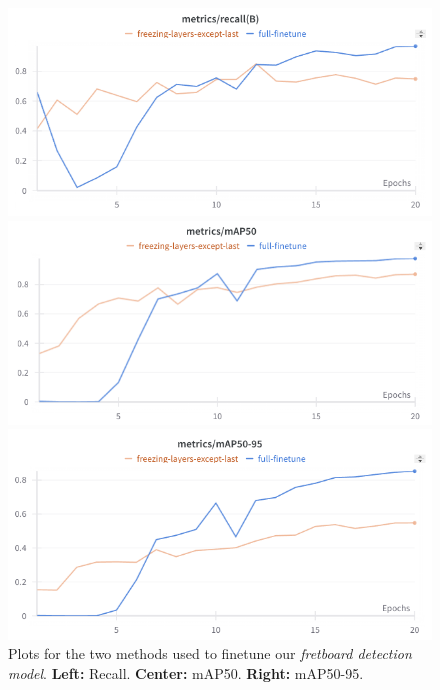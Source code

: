 \documentclass[10pt,twocolumn,letterpaper]{article}
\begin{document}
\begin{figure}[h]
    \begin{minipage}{0.33\textwidth}
        \centering
        \includegraphics[width=\textwidth]{images/interim/metrics-recall-fretboard.png}
    \end{minipage}
    \hfill
    \begin{minipage}{0.33\textwidth}
        \centering
        \includegraphics[width=\textwidth]{images/interim/metrics-mAP50-fretboard.png}
    \end{minipage}
    \hfill
    \begin{minipage}{0.33\textwidth}
        \centering
        \includegraphics[width=\textwidth]{images/interim/metrics-mAP50-95-fretboard.png}
    \end{minipage}
    \caption{Plots for the two methods used to finetune our \emph{fretboard detection model}. \textbf{Left:} Recall. \textbf{Center:} mAP50. \textbf{Right:} mAP50-95.} 
    \label{fig:metrics-fretboard}
\end{figure}
\end{document}

